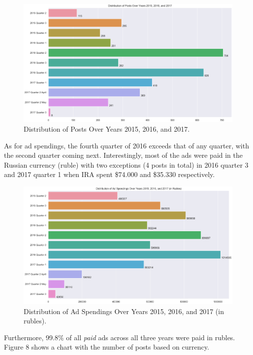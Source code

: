 \documentclass{article}
\begin{document}
\begin{figure}[H]
\centering
\includegraphics[width=\linewidth]{./image/barchart-plots/barchart_distribution_of_posts.png}
\caption{Distribution of Posts Over Years 2015, 2016, and 2017.}
\end{figure}

As for ad spendings, the fourth quarter of 2016 exceeds that of any quarter,
with the second quarter coming next. Interestingly, most of the ads were paid
in the Russian currency (ruble) with two exceptions (4 posts in total) in 2016
quarter 3 and 2017 quarter 1 when IRA spent \$74.000 and \$35.330 respectively.

\begin{figure}[H]
\centering
\includegraphics[width=\linewidth]{./image/barchart-plots/barchart_ad_spend_RU_distribution.png}
\caption{Distribution of Ad Spendings Over Years 2015, 2016, and 2017 (in rubles).}
\end{figure}

Furthermore, 99.8\% of all \textit{paid} ads across all three years were paid
in rubles. Figure 8 shows a chart with the number of posts based on currency.
\end{document}
